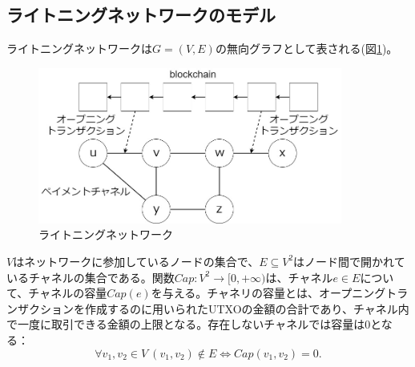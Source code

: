 \documentclass[12pt]{jarticle}
\begin{document}
\subsection{ライトニングネットワークのモデル}
ライトニングネットワークは$G=(V, E)$の無向グラフとして表される(図\ref{ln})。

\begin{figure}[h]
 \centering
   \includegraphics[width=100mm]{figures/LN.jpg}
 \caption{ライトニングネットワーク}
 \label{ln}
\end{figure}

$V$はネットワークに参加しているノードの集合で、$E \subseteq V^2$はノード間で開かれているチャネルの集合である。関数$Cap : V^2 \rightarrow [0, +\infty)$は、チャネル$e\in E$について、チャネルの容量$Cap(e)$を与える。チャネリの容量とは、オープニングトランザクションを作成するのに用いられたUTXOの金額の合計であり、チャネル内で一度に取引できる金額の上限となる。存在しないチャネルでは容量は0となる：
\begin{equation*}
\forall v_1,v_2\in V \ (v_1,v_2) \notin E \Leftrightarrow Cap(v_1,v_2) = 0.
\end{equation*}
\end{document}

